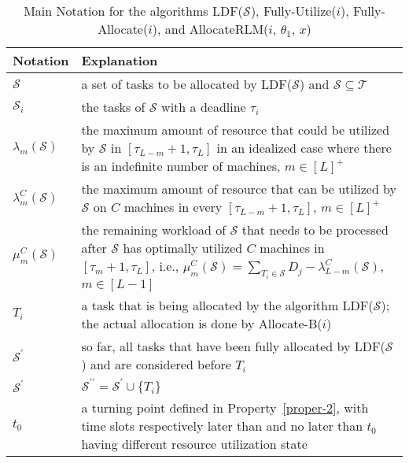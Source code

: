 \documentclass[10pt,journal,compsoc]{IEEEtran}
\begin{document}
\begin{table}
\centering
\begin{threeparttable}[!ht]

\caption{Main Notation for the algorithms LDF($\mathcal{S}$), Fully-Utilize($i$), Fully-Allocate($i$), and AllocateRLM($i$, $\theta_{1}$, $x$)}

\begin{tabular}{|C{1.2cm}|C{6.2cm}|}
\hline
   Notation & Explanation\\
\hline

$\mathcal{S}$ & a set of tasks to be allocated by LDF($\mathcal{S}$) and $\mathcal{S}\subseteq\mathcal{T}$ \\ \hline

$\mathcal{S}_{i}$ & the tasks of $\mathcal{S}$ with a deadline $\tau_{i}$  \\ \hline

$\lambda_{m}(\mathcal{S})$ & the maximum amount of resource that could be utilized by $\mathcal{S}$ in $[\tau_{L-m}+1, \tau_{L}]$ in an idealized case where there is an indefinite number of machines, $m\in[L]^{+}$   \\ \hline

$\lambda_{m}^{C}(\mathcal{S})$  & the maximum amount of resource that can be utilized by $\mathcal{S}$ on $C$ machines in every $[\tau_{L-m}+1, \tau_{L}]$, $m\in[L]^{+}$  \\ \hline

$\mu_{m}^{C}(\mathcal{S})$  &  the remaining workload of $\mathcal{S}$ that needs to be processed after $\mathcal{S}$ has optimally utilized $C$ machines in $[\tau_{m}+1, \tau_{L}]$, i.e., $\mu_{m}^{C}(\mathcal{S})=\sum_{T_{i}\in\mathcal{S}}{D_{j}}-\lambda_{L-m}^{C}(\mathcal{S})$, $m\in[L-1]$  \\ \hline

$T_{i}$ & a task that is being allocated by the algorithm LDF($\mathcal{S}$); the actual allocation is done by Allocate-B($i$) \\ \hline

$\mathcal{S}^{\prime}$ & so far, all tasks that have been fully allocated by LDF($\mathcal{S}$) and are considered before $T_{i}$  \\ \hline

$\mathcal{S}^{\prime}$ & $\mathcal{S}^{\prime\prime}=\mathcal{S}^{\prime}\cup\{ T_{i} \}$  \\ \hline

$t_{0}$ & a turning point defined in Property~\ref{proper-2}, with time slots respectively later than and no later than $t_{0}$ having different resource utilization state  \\ \hline


\end{tabular}
\end{threeparttable}
\end{table}
\end{document}
